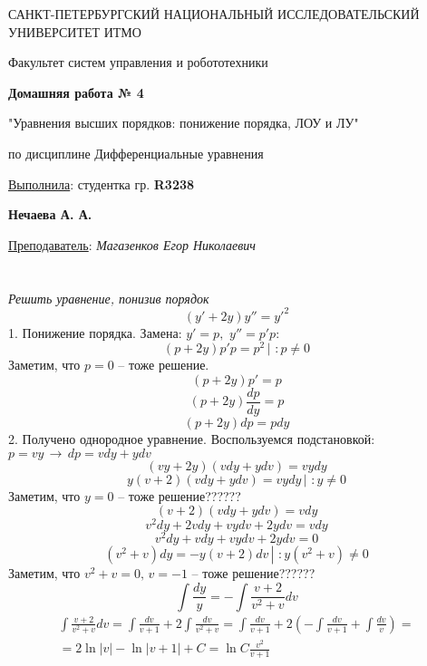 \documentclass[a5paper, 10pt]{article}
\theoremstyle{definition}
\theoremstyle{plain}
\theoremstyle{remark}
\newcommand*{\titlePage}{
	\thispagestyle{title}
	\begingroup
	\begin{center}
		\vspace*{6ex}
		
		{\small
			САНКТ-ПЕТЕРБУРГСКИЙ НАЦИОНАЛЬНЫЙ ИССЛЕДОВАТЕЛЬСКИЙ УНИВЕРСИТЕТ ИТМО	
		}
		
		\vspace*{2ex}
		
		{\normalsize
			Факультет систем управления и робототехники
		}
		
		\vspace*{15ex}
		
		{\Large \bfseries 
			Домашняя работа № 4
		}
\vspace*{2ex}
	{\Large \bfseries 
			
"Уравнения высших порядков: понижение порядка, ЛОУ и ЛУ"
		}
\vspace*{2ex}
		
		{\normalsize
			по дисциплине Дифференциальные уравнения
		}

	\end{center}
	\vspace*{20ex}
	\begin{flushright}
		{\large 
			\underline{Выполнила}: студентка гр. \textbf{R3238}\\
			\begin{flushright}
				\textbf{Нечаева А. А.}\\
			\end{flushright}
		}
		
		\vspace*{5ex}
		
		{\large 
			\underline{Преподаватель}: \textit{Магазенков Егор Николаевич}
		}
	\end{flushright}	
	\newpage
	\setcounter{page}{1}
	\endgroup}
\begin{document}
	\titlePage
	\pagestyle{style}
\newpage
\section{}
\textit{Решить уравнение, понизив порядок}
\\
\begin{equation}
\left( y' + 2y \right) y'' = y'^2
\end{equation}
1. Понижение порядка. Замена: $y'=p, \, \, y''=p'p$:
\begin{equation}
\left( p + 2y \right) p'p = p^2 \, \left|\, \, : p \neq 0 \right.
\end{equation}
Заметим, что $p=0$ -- тоже решение.
\begin{equation}
\left( p + 2y \right) p' = p
\end{equation}
\begin{equation}
\left( p + 2y \right) \frac{dp}{dy} = p
\end{equation}
\begin{equation}
\left( p + 2y \right) dp = pdy
\end{equation}
2. Получено однородное уравнение. Воспользуемся подстановкой: $p = vy \, \to \, dp=vdy+ydv$
\begin{equation}
\left( vy + 2y \right) \left(  vdy+ydv \right) =  vydy
\end{equation}
\begin{equation}
y\left( v + 2 \right) \left(  vdy+ydv \right) =  vydy  \, \left|\, \, : y \neq 0 \right.
\end{equation}
Заметим, что $y=0$ -- тоже решение??????
\begin{equation}
\left( v + 2 \right) \left(  vdy+ydv \right) =  vdy 
\end{equation}
\begin{equation}
v^2dy+2vdy+vydv+2ydv=vdy
\end{equation}
\begin{equation}
v^2dy+vdy+vydv+2ydv=0
\end{equation}
\begin{equation}
(v^2+v)dy=-y(v+2)dv  \, \left|\, \, : y (v^2+v) \neq 0 \right.
\end{equation}
Заметим, что $v^2+v = 0, \, v = -1$ -- тоже решение??????
\begin{equation}
\int \frac{dy}{y} = -\int \frac{v+2}{v^2+v}dv
\end{equation}
\begin{multline}
\int \frac{v+2}{v^2+v}dv = \int \frac{dv}{v+1} + 2\int \frac{dv}{v^2+v} = \int \frac{dv}{v+1} + 2\left(-\int \frac{dv}{v+1}+ \int \frac{dv}{v} \right) = \\
= 2 \ln |v| - \ln |v+1| + C = \ln C \frac{v^2}{v+1}
\end{multline}
\end{document}
